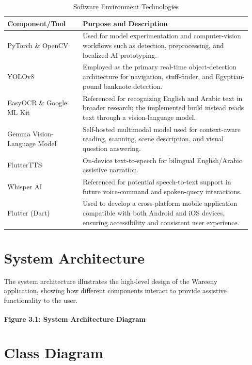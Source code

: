 \documentclass[12pt,a4paper]{report}
\begin{document}
\begin{table}[h]
\centering
\caption{Software Environment Technologies}
\begin{tabularx}{\textwidth}{|>{\raggedright\arraybackslash}p{}|>{\raggedright\arraybackslash}X|}
\hline
\textbf{Component/Tool} & \textbf{Purpose and Description} \\
\hline
PyTorch \& OpenCV & Used for model experimentation and computer-vision workflows such as detection, preprocessing, and localized AI prototyping. \\
\hline
YOLOv8 & Employed as the primary real-time object-detection architecture for navigation, stuff-finder, and Egyptian-pound banknote detection. \\
\hline
EasyOCR \& Google ML Kit & Referenced for recognizing English and Arabic text in broader research; the implemented build instead reads text through a vision-language model. \\
\hline
Gemma Vision-Language Model & Self-hosted multimodal model used for context-aware reading, scanning, scene description, and visual question answering. \\
\hline
FlutterTTS & On-device text-to-speech for bilingual English/Arabic assistive narration. \\
\hline
Whisper AI & Referenced for potential speech-to-text support in future voice-command and spoken-query interactions. \\
\hline
Flutter (Dart) & Used to develop a cross-platform mobile application compatible with both Android and iOS devices, ensuring accessibility and consistent user experience. \\
\hline
\end{tabularx}
\end{table}

\section{System Architecture}

The system architecture illustrates the high-level design of the Wareeny application, showing how different components interact to provide assistive functionality to the user.

\paragraph*{Figure 3.1: System Architecture Diagram}

\section{Class Diagram}
\end{document}
